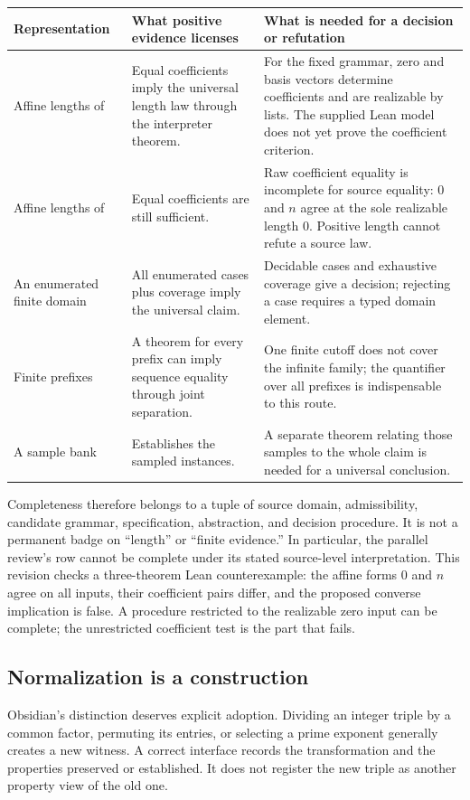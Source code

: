 \documentclass[11pt,letterpaper]{article}
\newcommand{\code}[1]{\texttt{\detokenize{#1}}}
\theoremstyle{definition}\newtheorem{definition}[proposition]{Definition}
\theoremstyle{remark}\newtheorem{remark}[proposition]{Remark}
\begin{document}
\begin{center}\small
\begin{tabularx}{\textwidth}{@{}P{0.25\textwidth}Y Y@{}}
\toprule Representation & What positive evidence licenses & What is needed for a decision or refutation\\\midrule
Affine lengths of \code{List Nat} & Equal coefficients imply the universal length law through the interpreter theorem. & For the fixed grammar, zero and basis vectors determine coefficients and are realizable by lists. The supplied Lean model does not yet prove the coefficient criterion.\\
Affine lengths of \code{List Empty} & Equal coefficients are still sufficient. & Raw coefficient equality is incomplete for source equality: $0$ and $n$ agree at the sole realizable length $0$. Positive length cannot refute a source law.\\
An enumerated finite domain & All enumerated cases plus coverage imply the universal claim. & Decidable cases and exhaustive coverage give a decision; rejecting a case requires a typed domain element.\\
Finite prefixes & A theorem for every prefix can imply sequence equality through joint separation. & One finite cutoff does not cover the infinite family; the quantifier over all prefixes is indispensable to this route.\\
A sample bank & Establishes the sampled instances. & A separate theorem relating those samples to the whole claim is needed for a universal conclusion.\\
\bottomrule
\end{tabularx}
\end{center}

Completeness therefore belongs to a tuple of source domain, admissibility,
candidate grammar, specification, abstraction, and decision procedure. It is
not a permanent badge on ``length'' or ``finite evidence.'' In particular,
the parallel review's \code{List Empty} row cannot be complete under its
stated source-level interpretation. This revision checks a three-theorem Lean
counterexample: the affine forms $0$ and $n$ agree on all \code{List Empty}
inputs, their coefficient pairs differ, and the proposed converse implication
is false. A procedure restricted to the realizable zero input can be complete;
the unrestricted coefficient test is the part that fails.

\subsection{Normalization is a construction}
Obsidian's distinction deserves explicit adoption. Dividing an integer triple
by a common factor, permuting its entries, or selecting a prime exponent
generally creates a new witness. A correct interface records the transformation
and the properties preserved or established. It does not register the new
triple as another property view of the old one.
\end{document}

